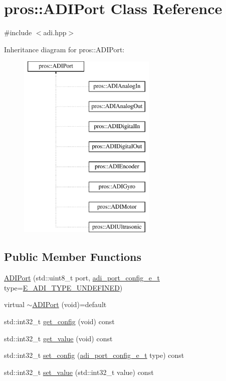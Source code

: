\hypertarget{classpros_1_1ADIPort}{}\section{pros\+:\+:A\+D\+I\+Port Class Reference}
\label{classpros_1_1ADIPort}


{\ttfamily \#include $<$adi.\+hpp$>$}

Inheritance diagram for pros\+:\+:A\+D\+I\+Port\+:\begin{figure}[H]
\begin{center}
\leavevmode
\includegraphics[height=9.000000cm]{classpros_1_1ADIPort}
\end{center}
\end{figure}
\subsection*{Public Member Functions}
\begin{DoxyCompactItemize}
\item 
\hyperlink{classpros_1_1ADIPort_ab6ef7710de366895859d770ffb1d8cf1}{A\+D\+I\+Port} (std\+::uint8\+\_\+t port, \hyperlink{adi_8h_a4efff81399e823764aa05cd5c172ea55}{adi\+\_\+port\+\_\+config\+\_\+e\+\_\+t} type=\hyperlink{adi_8h_ad5f9ddf0fd9de73c4b23fa5485144b7fa37e9d6ebc03d88c58db1904a7f2b7373}{E\+\_\+\+A\+D\+I\+\_\+\+T\+Y\+P\+E\+\_\+\+U\+N\+D\+E\+F\+I\+N\+ED})
\item 
virtual \hyperlink{classpros_1_1ADIPort_ae6a3753c05e008992e6eff5e8c927e46}{$\sim$\+A\+D\+I\+Port} (void)=default
\item 
std\+::int32\+\_\+t \hyperlink{classpros_1_1ADIPort_a1227bc815b12d2789cb78f6d3dcaf37b}{get\+\_\+config} (void) const
\item 
std\+::int32\+\_\+t \hyperlink{classpros_1_1ADIPort_ac79b5fd3ce67ae6ffc4b1fbbb306e997}{get\+\_\+value} (void) const
\item 
std\+::int32\+\_\+t \hyperlink{classpros_1_1ADIPort_abd86653eebbc34b863ace81839f7e40c}{set\+\_\+config} (\hyperlink{adi_8h_a4efff81399e823764aa05cd5c172ea55}{adi\+\_\+port\+\_\+config\+\_\+e\+\_\+t} type) const
\item 
std\+::int32\+\_\+t \hyperlink{classpros_1_1ADIPort_ae6711117fbceb3bb6e3602c4ef63aff1}{set\+\_\+value} (std\+::int32\+\_\+t value) const
\end{DoxyCompactItemize}
